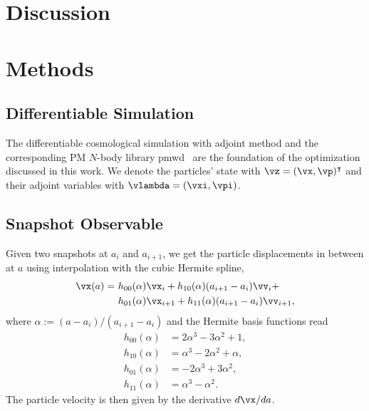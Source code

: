 \documentclass[modern, trackchanges, dvipsnames]{aastex631}
\newcommand{\pmwd}{{\usefont{T1}{nova}{m}{sl}pmwd}}
\renewcommand{\d}{d}
\begin{document}
\vspace{1em}
\section{Discussion}


\vspace{1em}
\section{Methods}


\vspace{1em}
\subsection{Differentiable Simulation}

The differentiable cosmological simulation with adjoint method \citep{Li2022a}
and the corresponding PM $N$-body library \pmwd\ \citep{Li2022b} are the
foundation of the optimization discussed in this work.
We denote the particles' state with $\vz = (\vx, \vp)^\intercal$ and their
adjoint variables with $\vlambda = (\vxi, \vpi)$.



\vspace{1em}
\subsection{Snapshot Observable}
\label{sec:snapobs}

Given two snapshots at $a_i$ and $a_{i+1}$, we get the particle displacements
in between at $a$ using interpolation with the cubic Hermite spline,
\begin{align}
  \vx(a) =\ &h_{00}(\alpha)\vx_i + h_{10}(\alpha)(a_{i+1} - a_i)\vv_i + \nonumber\\
           &h_{01}(\alpha)\vx_{i+1} + h_{11}(\alpha)(a_{i+1} - a_i)\vv_{i+1},
\end{align}
where $\alpha := (a - a_i)/(a_{i+1} - a_i)$ and the Hermite basis functions read
\begin{align}
  h_{00}(\alpha) &= 2\alpha^3 - 3\alpha^2 + 1, \nonumber\\
  h_{10}(\alpha) &= \alpha^3 - 2\alpha^2 + \alpha, \nonumber\\
  h_{01}(\alpha) &= -2\alpha^3 + 3\alpha^2, \nonumber\\
  h_{11}(\alpha) &= \alpha^3 - \alpha^2.
\end{align}
The particle velocity is then given by the derivative $\d\vx / \d a$.
\end{document}
